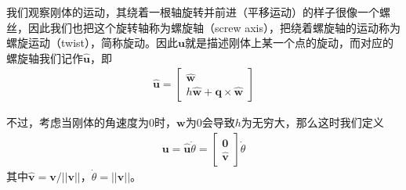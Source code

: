 \documentclass[12pt, a4paper, article, UTF8]{ctexart}
\begin{document}
我们观察刚体的运动，其绕着一根轴旋转并前进（平移运动）的样子很像一个螺丝，因此我们也把这个旋转轴称为螺旋轴（screw axis），把绕着螺旋轴的运动称为螺旋运动（twist），简称旋动。因此$\mathbf{u}$就是描述刚体上某一个点的旋动，而对应的螺旋轴我们记作$\hat{\mathbf{u}}$，即
\begin{align}
\hat{\mathbf{u}} = \begin{bmatrix}
\hat{\mathbf{w}} \\  h\hat{\mathbf{w}} + \mathbf{q}\times \hat{\mathbf{w}} 
\end{bmatrix} \label{eq:screwaxis}
\end{align}

不过，考虑当刚体的角速度为0时，$\mathbf{w}$为0会导致$h$为无穷大，那么这时我们定义
\begin{align}
\mathbf{u} = \hat{\mathbf{u}}\dot{\theta} = \begin{bmatrix}
\mathbf{0} \\ \hat{\mathbf{v}}
\end{bmatrix}\dot{\theta}
\end{align}
其中$\hat{\mathbf{v}} = \mathbf{v}/||\mathbf{v}||$，$\dot{\theta} = ||\mathbf{v}||$。
\end{document}
